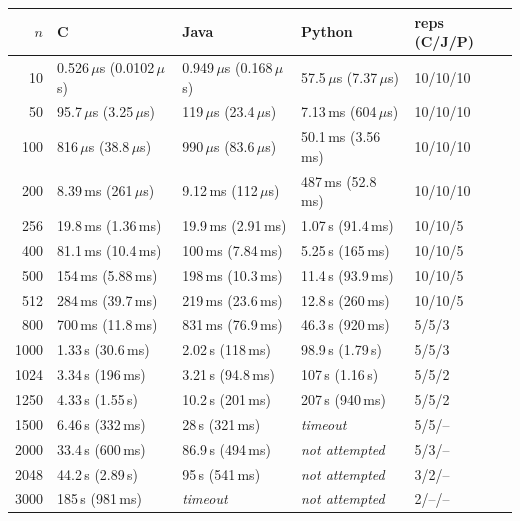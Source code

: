\begin{tabular}{rllll}
\toprule
$n$ & C & Java & Python & reps (C/J/P) \\
\midrule
10 & 0.526\,$\mu$s (0.0102\,$\mu$s) & 0.949\,$\mu$s (0.168\,$\mu$s) & 57.5\,$\mu$s (7.37\,$\mu$s) & 10/10/10 \\
50 & 95.7\,$\mu$s (3.25\,$\mu$s) & 119\,$\mu$s (23.4\,$\mu$s) & 7.13\,ms (604\,$\mu$s) & 10/10/10 \\
100 & 816\,$\mu$s (38.8\,$\mu$s) & 990\,$\mu$s (83.6\,$\mu$s) & 50.1\,ms (3.56\,ms) & 10/10/10 \\
200 & 8.39\,ms (261\,$\mu$s) & 9.12\,ms (112\,$\mu$s) & 487\,ms (52.8\,ms) & 10/10/10 \\
256 & 19.8\,ms (1.36\,ms) & 19.9\,ms (2.91\,ms) & 1.07\,s (91.4\,ms) & 10/10/5 \\
400 & 81.1\,ms (10.4\,ms) & 100\,ms (7.84\,ms) & 5.25\,s (165\,ms) & 10/10/5 \\
500 & 154\,ms (5.88\,ms) & 198\,ms (10.3\,ms) & 11.4\,s (93.9\,ms) & 10/10/5 \\
512 & 284\,ms (39.7\,ms) & 219\,ms (23.6\,ms) & 12.8\,s (260\,ms) & 10/10/5 \\
800 & 700\,ms (11.8\,ms) & 831\,ms (76.9\,ms) & 46.3\,s (920\,ms) & 5/5/3 \\
1000 & 1.33\,s (30.6\,ms) & 2.02\,s (118\,ms) & 98.9\,s (1.79\,s) & 5/5/3 \\
1024 & 3.34\,s (196\,ms) & 3.21\,s (94.8\,ms) & 107\,s (1.16\,s) & 5/5/2 \\
1250 & 4.33\,s (1.55\,s) & 10.2\,s (201\,ms) & 207\,s (940\,ms) & 5/5/2 \\
1500 & 6.46\,s (332\,ms) & 28\,s (321\,ms) & \textit{timeout} & 5/5/-- \\
2000 & 33.4\,s (600\,ms) & 86.9\,s (494\,ms) & \textit{not attempted} & 5/3/-- \\
2048 & 44.2\,s (2.89\,s) & 95\,s (541\,ms) & \textit{not attempted} & 3/2/-- \\
3000 & 185\,s (981\,ms) & \textit{timeout} & \textit{not attempted} & 2/--/-- \\
\bottomrule
\end{tabular}
